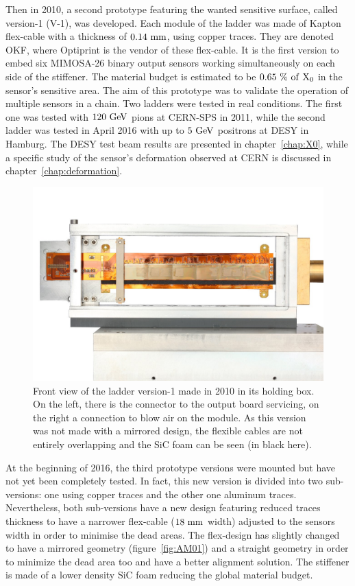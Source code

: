     Then in 2010, a second prototype featuring the wanted sensitive surface, called version-1 (V-1), was developed.
    Each module of the ladder was made of Kapton flex-cable with a thickness of $0.14~\rm{mm}$, using copper traces.
    They are denoted \gls{OKF}, where Optiprint is the vendor of these flex-cable.
    It is the first version to embed six \gls{MIMOSA}-26 binary output sensors working simultaneously on each side of the stiffener.
    The material budget is estimated to be $0.65~\% ~\rm{of}~\rm{X_0}$ in the sensor's sensitive area. 
    The aim of this prototype was to validate the operation of multiple sensors in a chain.
    Two ladders were tested in real conditions.
    The first one was tested with $120~\rm{GeV}$ pions at CERN-SPS in 2011, while the second ladder was tested in April 2016 with up to $5~\rm{GeV}$ positrons at DESY in Hamburg. 
    The DESY test beam results are presented in chapter~\ref{chap:X0}, while a specific study of the sensor's deformation observed at CERN is discussed in chapter~\ref{chap:deformation}.

    \begin{figure}[!h]
      \centering
      \includegraphics[width = 12 cm]{Pictures/vxd/plume_ladder2010_frontView}
      \caption{Front view of the ladder version-1 made in 2010 in its holding box. On the left, there is the connector to the output board servicing, on the right a connection to blow air on the module. As this version was not made with a mirrored design, the flexible cables are not entirely overlapping and the SiC foam can be seen (in black here).}
    \end{figure}

    At the beginning of 2016, the third prototype versions were mounted but have not yet been completely tested.
    In fact, this new version is divided into two sub-versions: one using copper traces and the other one aluminum traces.
    Nevertheless, both sub-versions have a new design featuring reduced traces thickness to have a narrower flex-cable ($18~\rm{mm}$ width) adjusted to the sensors width in order to minimise the dead areas.
    The flex-design has slightly changed to have a mirrored geometry (figure~\ref{fig:AM01}) and a straight geometry in order to minimize the dead area too and have a better alignment solution.
    The stiffener is made of a lower density \gls{SiC} foam reducing the global material budget. 

